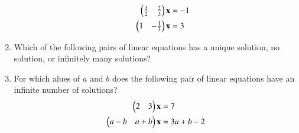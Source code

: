 \begin{enumerate}[label=\arabic*.,ref=\thesubsection.\theenumi]
\begin{enumerate}[itemsep=2pt]
\begin{multicols}{2}
\begin{align}
\begin{split}
\begin{pmatrix}\frac{1}{2} & \frac{2}{3} \end{pmatrix}\mathbf{x}&=-1
\\
\begin{pmatrix}{1} & -\frac{1}{3} \end{pmatrix}\mathbf{x}&=3
\end{split}
\end{align}
\end{multicols}
\end{enumerate}
%
%
\item Which of the following pairs of linear equations has a unique solution, no solution, or infinitely many solutions?
%
\begin{enumerate}[itemsep=2pt]
\end{enumerate}
%
\item For which alues of $a$ and $b$ does the following pair of linear equations have an infinite number of solutions?
\begin{align}
\begin{split}
\myvec{2 & 3 }\vec{x}&=7
\\
\myvec{a-b & a+b }\vec{x}&=3a+b-2
\end{split}

\end{align}
\end{enumerate}
